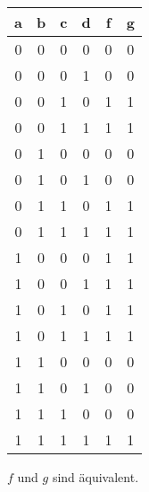 \documentclass{CInf_practice}
\begin{document}


\begin{center}
  \begin{tabular}{cccc|c|c}
    \bf a & \bf b & \bf c & \bf d & \bf f & \bf g \\ \hline
    0 & 0 & 0 & 0 & 0 & 0 \\
    0 & 0 & 0 & 1 & 0 & 0 \\
    0 & 0 & 1 & 0 & 1 & 1 \\
    0 & 0 & 1 & 1 & 1 & 1 \\
    0 & 1 & 0 & 0 & 0 & 0 \\
    0 & 1 & 0 & 1 & 0 & 0 \\
    0 & 1 & 1 & 0 & 1 & 1 \\
    0 & 1 & 1 & 1 & 1 & 1 \\
    1 & 0 & 0 & 0 & 1 & 1 \\
    1 & 0 & 0 & 1 & 1 & 1 \\
    1 & 0 & 1 & 0 & 1 & 1 \\
    1 & 0 & 1 & 1 & 1 & 1 \\
    1 & 1 & 0 & 0 & 0 & 0 \\
    1 & 1 & 0 & 1 & 0 & 0 \\
    1 & 1 & 1 & 0 & 0 & 0 \\
    1 & 1 & 1 & 1 & 1 & 1 
  \end{tabular}
\end{center}

$f$ und $g$ sind äquivalent.
\end{document}
